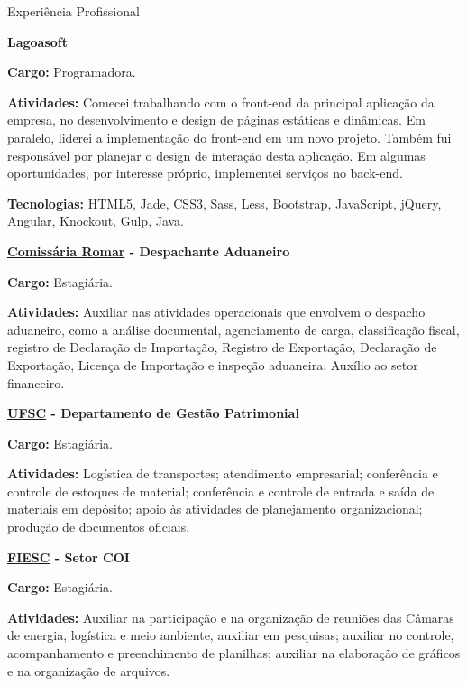 \begin{rubric}{Experiência Profissional}{

  \entry*[2016 - Atual]
  \textbf{Lagoasoft}

  \textbf{Cargo:} Programadora.

  \textbf{Atividades:} Comecei trabalhando com o front-end da principal aplicação da empresa,
   no desenvolvimento e design de páginas estáticas e dinâmicas. Em paralelo, liderei a implementação
   do front-end em um novo projeto. Também fui responsável por planejar o design de interação desta aplicação.
   Em algumas oportunidades, por interesse próprio, implementei serviços no back-end.
   
  \textbf{Tecnologias:} HTML5, Jade, CSS3, Sass, Less, Bootstrap, JavaScript, jQuery, Angular,
  Knockout, Gulp, Java.

  \entry*[2014]
  \textbf{\href{http://www.comissariaromar.com.br/}{Comissária Romar}
    - Despachante Aduaneiro}

  \textbf{Cargo:} Estagiária.

  \textbf{Atividades:} Auxiliar nas atividades operacionais que
  envolvem o despacho aduaneiro, como a análise documental,
  agenciamento de carga, classificação fiscal, registro de
  Declaração de Importação, Registro de Exportação, Declaração de
  Exportação, Licença de Importação e inspeção aduaneira. Auxílio ao
  setor financeiro.

  \entry*[2013 - 2014]
  \textbf{\href{http://www.ufsc.br/}{UFSC} - Departamento de Gestão
    Patrimonial}

  \textbf{Cargo:} Estagiária.

  \textbf{Atividades:} Logística de transportes; atendimento
  empresarial; conferência e controle de estoques de material;
  conferência e controle de entrada e saída de materiais em depósito;
  apoio às atividades de planejamento organizacional; produção de
  documentos oficiais.

  \entry*[2012 - 2013]
  \textbf{\href{http://www.fiesc.com.br/}{FIESC} - Setor COI}

  \textbf{Cargo:} Estagiária.

  \textbf{Atividades:} Auxiliar na participação e na organização de
  reuniões das Câmaras de energia, logística e meio ambiente, auxiliar
  em pesquisas; auxiliar no controle, acompanhamento e preenchimento
  de planilhas; auxiliar na elaboração de gráficos e na organização de
  arquivos.

}\end{rubric}

